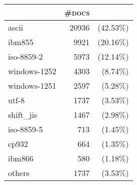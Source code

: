 \begin{tabular}{lrr} 
 \toprule 
 & \textsc{\#docs} & \\ 
 \midrule 
ascii&20936 &(42.53$\%$)\\ 
  ibm855&9921 &(20.16$\%$)\\ 
  iso-8859-2&5973 &(12.14$\%$)\\ 
  windows-1252&4303 &(8.74$\%$)\\ 
  windows-1251&2597 &(5.28$\%$)\\ 
  utf-8&1737 &(3.53$\%$)\\ 
  shift\_jis&1467 &(2.98$\%$)\\ 
  iso-8859-5&713 &(1.45$\%$)\\ 
  cp932&664 &(1.35$\%$)\\ 
  ibm866&580 &(1.18$\%$)\\ 
  \bottomrule 
others&1737 &(3.53$\%$)\\ 
  \bottomrule 
 \end{tabular}
